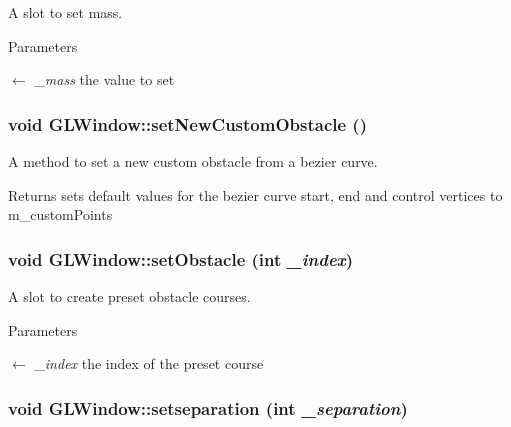 A slot to set mass. 
\begin{DoxyParams}{Parameters}
\item[\mbox{$\leftarrow$} {\em \_\-mass}]the value to set \end{DoxyParams}
\hypertarget{classGLWindow_a90ba0ee1334aa3d5ed555e9c21c2861d}{
\subsubsection[{setNewCustomObstacle}]{\setlength{\rightskip}{0pt plus 5cm}void GLWindow::setNewCustomObstacle ()}}
\label{classGLWindow_a90ba0ee1334aa3d5ed555e9c21c2861d}


A method to set a new custom obstacle from a bezier curve. \begin{DoxyReturn}{Returns}
sets default values for the bezier curve start, end and control vertices to m\_\-customPoints 
\end{DoxyReturn}
\hypertarget{classGLWindow_a6ac328520cd7812b3824d4bd3b2961ff}{
\subsubsection[{setObstacle}]{\setlength{\rightskip}{0pt plus 5cm}void GLWindow::setObstacle (int {\em \_\-index})}}
\label{classGLWindow_a6ac328520cd7812b3824d4bd3b2961ff}


A slot to create preset obstacle courses. 
\begin{DoxyParams}{Parameters}
\item[\mbox{$\leftarrow$} {\em \_\-index}]the index of the preset course \end{DoxyParams}
\hypertarget{classGLWindow_a638feb645e9c15dc4c2201d8d91d2eed}{
\subsubsection[{setseparation}]{\setlength{\rightskip}{0pt plus 5cm}void GLWindow::setseparation (int {\em \_\-separation})}}
\label{classGLWindow_a638feb645e9c15dc4c2201d8d91d2eed}


